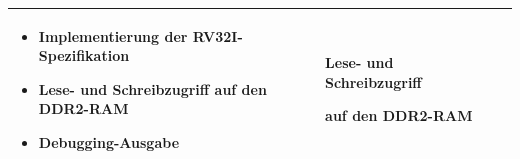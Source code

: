 \begin{table}[H]
\begin{tabular}{|p{45pt}|p{80pt}|p{220pt}|p{115pt}|}
\begin{itemize}[noitemsep,topsep=0pt,itemindent=0pt]
                                                                                      \item Implementierung der RV32I-Spezifikation
                                                                                      \item Lese- und Schreibzugriff auf den DDR2-RAM
                                                                                      \item Debugging-Ausgabe
                                                                                      \end{itemize}                                                              & \begin{description}[noitemsep,topsep=0pt]
                                                                                                                                                                   \item Lese- und Schreibzugriff
                                                                                                                                                                   \item auf den DDR2-RAM
                                                                                                                                                                   \end{description}                        \\
\hline


\end{tabular}
\end{table}
